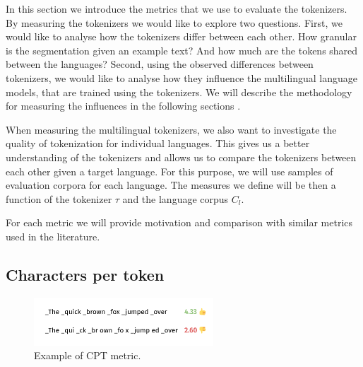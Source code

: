 

In this section we introduce the metrics that we use to evaluate the tokenizers. By measuring the tokenizers we would like to explore two questions. First, we would like to analyse how the tokenizers differ between each other. How granular is the segmentation given an example text? And how much are the tokens shared between the languages? Second, using the observed differences between tokenizers, we would like to analyse how they influence the multilingual language models, that are trained using the tokenizers. We will describe the methodology for measuring the influences in the following sections .

When measuring the multilingual tokenizers, we also want to investigate the quality of tokenization for individual languages. This gives us a better understanding of the tokenizers and allows us to compare the tokenizers between each other given a target language. For this purpose, we will use samples of evaluation corpora for each language. The measures we define will be then a function of the tokenizer $\tau$ and the language corpus $C_l$. 

For each metric we will provide motivation and comparison with similar metrics used in the literature. 


\subsection{Characters per token}

\begin{figure}[h]
    \centering
    \includegraphics[width=0.6\textwidth]{img/temp/cpt_example.png}
    \caption{Example of CPT metric.}
    \label{fig:cpt_example}
\end{figure}

